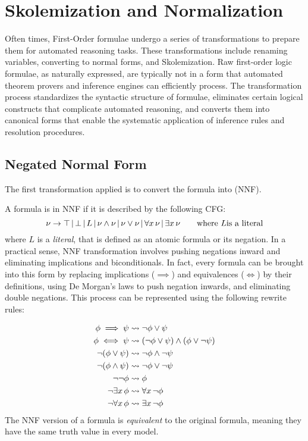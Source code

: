 \section{Skolemization and Normalization}\label{sec:skolemization_and_normalization}

Often times, First-Order formulae undergo a series of transformations to prepare them for automated reasoning tasks.
These transformations include renaming variables, converting to normal forms, and Skolemization.
Raw first-order logic formulae, as naturally expressed, are typically not in a form that automated theorem provers and inference engines can efficiently process.
The transformation process standardizes the syntactic structure of formulae, eliminates certain logical constructs that complicate automated reasoning, and converts them into canonical forms that enable the systematic application of inference rules and resolution procedures.

\subsection{Negated Normal Form}\label{subsec:negated_normal_form}
The first transformation applied is to convert the formula into  (NNF).

A formula is in NNF if it is described by the following CFG\@:
\begin{equation}
  \nu \to \top  \, | \,  \bot  \, | \,  L  \, | \,  \nu \land \nu  \, | \,  \nu \lor \nu  \, | \,  \forall x  \,  \nu  \, | \,  \exists x  \,  \nu \quad\quad \text{where } L \text{is a literal}
\end{equation}
where \(L\) is a \emph{literal}, that is defined as an atomic formula or its negation.
In a practical sense, NNF transformation involves pushing negations inward and eliminating implications and biconditionals.
In fact, every formula can be brought into this form by replacing implications (\(\implies\)) and equivalences (\(\iff\)) by their definitions, using De Morgan's laws to push negation inwards, and eliminating double negations. This process can be represented using the following rewrite rules:

\begin{equation}
  \begin{aligned}
    \phi \implies \psi &\leadsto \neg \phi \lor \psi \\
    \phi \iff \psi &\leadsto (\neg \phi \lor \psi) \land (\phi \lor \neg \psi) \\
    \neg (\phi \lor \psi) &\leadsto \neg \phi \land \neg \psi \\
    \neg (\phi \land \psi) &\leadsto \neg \phi \lor \neg \psi \\
    \neg \neg \phi &\leadsto \phi \\
    \neg \exists x  \,  \phi &\leadsto \forall x  \,  \neg \phi \\
    \neg \forall x  \,  \phi &\leadsto \exists x  \,  \neg \phi
  \end{aligned}
\end{equation}
The NNF version of a formula is \emph{equivalent} to the original formula, meaning they have the same truth value in every model.

